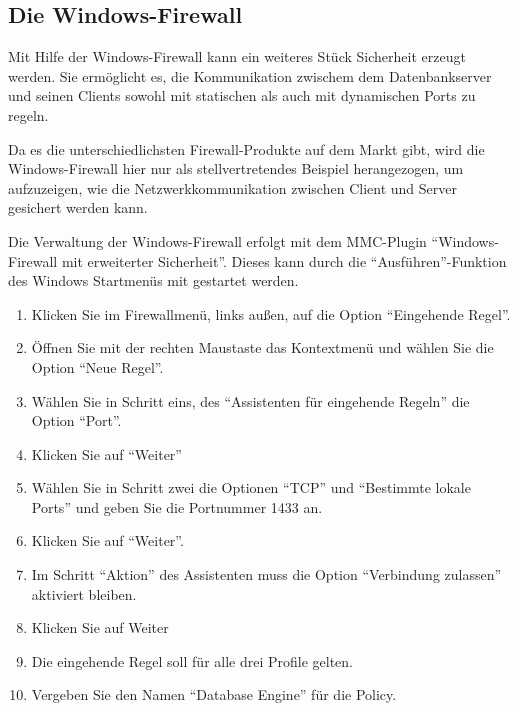       \subsection{Die Windows-Firewall}
        Mit Hilfe der Windows-Firewall kann ein weiteres Stück Sicherheit erzeugt
        werden. Sie ermöglicht es, die Kommunikation zwischem dem
        Datenbankserver und seinen Clients sowohl mit statischen als auch mit
        dynamischen Ports zu regeln.
        \begin{merke}
          Da es die unterschiedlichsten Firewall-Produkte auf dem Markt gibt,
          wird die Windows-Firewall hier nur als stellvertretendes Beispiel
          herangezogen, um aufzuzeigen, wie die Netzwerkkommunikation zwischen
          Client und Server gesichert werden kann.
        \end{merke}
        Die Verwaltung der Windows-Firewall erfolgt mit dem MMC-Plugin
        \enquote{Windows-Firewall mit erweiterter Sicherheit}. Dieses kann
        durch die \enquote{Ausführen}-Funktion des Windows Startmenüs mit
         gestartet werden.
        \begin{enumerate}
          \item Klicken Sie im Firewallmenü, links außen, auf die Option
          \enquote{Eingehende Regel}.
          \item Öffnen Sie mit der rechten Maustaste das Kontextmenü und
          wählen Sie die Option \enquote{Neue Regel}.
          \item Wählen Sie in Schritt eins, des \enquote{Assistenten für
          eingehende Regeln} die Option \enquote{Port}.
          \item Klicken Sie auf \enquote{Weiter}
          \item Wählen Sie in Schritt zwei die Optionen \enquote{TCP} und
          \enquote{Bestimmte lokale Ports} und geben Sie die Portnummer 1433
          an.
          \item Klicken Sie auf \enquote{Weiter}.
          \item Im Schritt \enquote{Aktion} des Assistenten muss die Option
          \enquote{Verbindung zulassen} aktiviert bleiben.
            \item Klicken Sie auf Weiter
\clearpage
            \item Die eingehende Regel soll für alle drei Profile
            gelten.
          \item Vergeben Sie den Namen \enquote{Database Engine} für die
          Policy.
        \end{enumerate}
        \begin{literaturinternet}
          \item \cite{ms175043}
        \end{literaturinternet}
